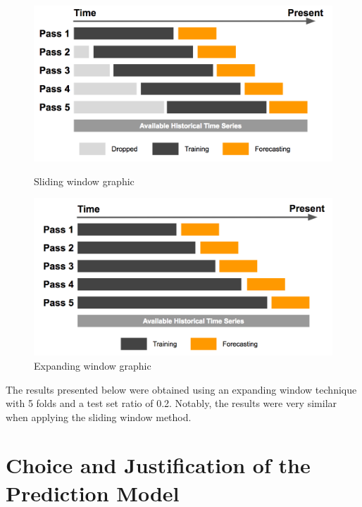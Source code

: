 \begin{figure}[H]
    \centering
    \begin{minipage}{0.45\textwidth}
        \centering
        \includegraphics[width=\textwidth, keepaspectratio]{images/FixedWindow.png}
        \caption{Sliding window graphic}
        \label{fig:sliding_window}
    \end{minipage}\hfill
    \begin{minipage}{0.45\textwidth}
        \centering
        \includegraphics[width=\textwidth, keepaspectratio]{images/ExpandingWindow.png}
        \caption{Expanding window graphic}
        \label{fig:expanding_window}
    \end{minipage}
\end{figure}


The results presented below were obtained using an expanding window technique with 5 folds and a test set ratio of 0.2. Notably, the results were very similar when applying the sliding window method.


\section{Choice and Justification of the Prediction Model}
\label{sec:model_choice}

